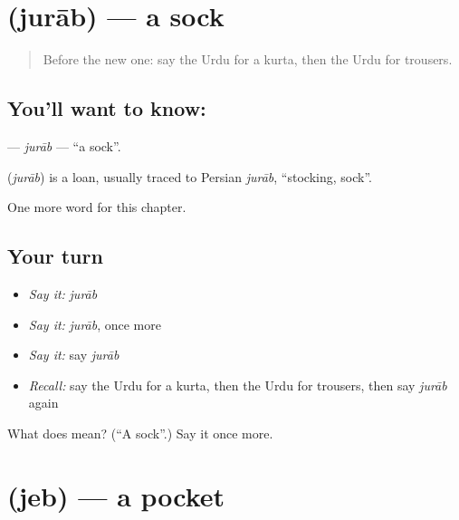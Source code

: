 \section[\texorpdfstring{\ur{جراب} (jurāb)}{جراب (jurāb)}]{ (jurāb) — a sock}

\label{lesson:UR-C82-jurab}



\begin{quote}
Before the new one: say the Urdu for a kurta, then the Urdu for trousers.
\end{quote}

\subsection*{You'll want to know: }
\textbf{} — \emph{jurāb} — \textquotedblleft{}a sock\textquotedblright{}.

\begin{cousinweb}
\textbf{} (\emph{jurāb}) is a loan, usually traced to Persian \emph{jurāb}, \textquotedblleft{}stocking, sock\textquotedblright{}.
\end{cousinweb}

\begin{grammarlens}[title={What you've built}]
One more word for this chapter.
\end{grammarlens}

\subsection*{Your turn}
\begin{itemize}
\raggedright
  \item \emph{Say it:} \emph{jurāb}
  \item \emph{Say it:} \emph{jurāb}, once more
  \item \emph{Say it:} say \emph{jurāb}
  \item \emph{Recall:} say the Urdu for a kurta, then the Urdu for trousers, then say \emph{jurāb} again
\end{itemize}

\begin{tcolorbox}[breakable,colback=teal!4,colframe=teal!35!black,title={Before you move on}]
What does  mean? (\textquotedblleft{}A sock\textquotedblright{}.) Say it once more.
\end{tcolorbox}
\section[\texorpdfstring{\ur{جیب} (jeb)}{جیب (jeb)}]{ (jeb) — a pocket}

